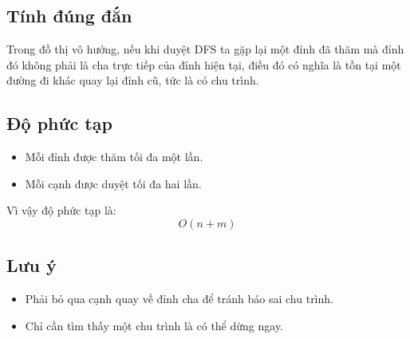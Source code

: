 \documentclass[a4paper,12pt]{article}
\begin{document}
\subsection*{Tính đúng đắn}
Trong đồ thị vô hướng, nếu khi duyệt DFS ta gặp lại một đỉnh đã thăm mà đỉnh đó không phải là cha trực tiếp của đỉnh hiện tại, điều đó có nghĩa là tồn tại một đường đi khác quay lại đỉnh cũ, tức là có chu trình.

\subsection*{Độ phức tạp}
\begin{itemize}
    \item Mỗi đỉnh được thăm tối đa một lần.
    \item Mỗi cạnh được duyệt tối đa hai lần.
\end{itemize}

Vì vậy độ phức tạp là:
\[
O(n + m)
\]

\subsection*{Lưu ý}
\begin{itemize}
    \item Phải bỏ qua cạnh quay về đỉnh cha để tránh báo sai chu trình.
    \item Chỉ cần tìm thấy một chu trình là có thể dừng ngay.
\end{itemize}
\end{document}
